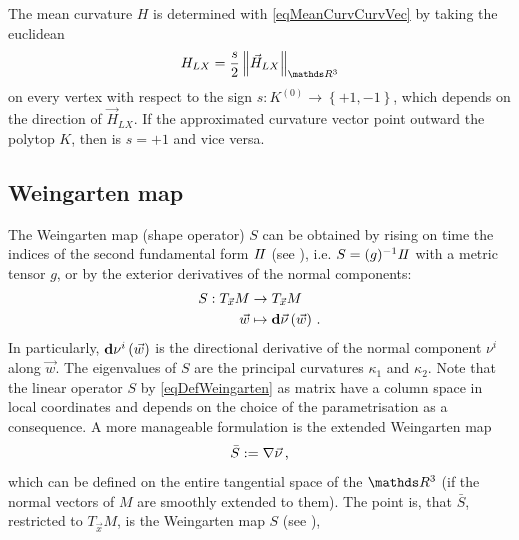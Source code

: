     The mean curvature \( H \) is determined with \eqref{eqMeanCurvCurvVec} by taking the euclidean 
    \begin{align}
      H_{LX} = \frac{s}{2}\left\| \vec{H}_{LX} \right\|_{\R^{3}}
    \end{align}
    on every vertex with respect to the sign \( s:K^{(0)}\rightarrow\left\{ +1,-1 \right\} \),
    which depends on the direction of \(  \vec{H}_{LX} \).
    If the approximated curvature vector point outward the polytop \( K \), then is \( s=+1 \) and vice versa. 

    
    


  \subsection{Weingarten map} \label{secWeingarten}
    The Weingarten map (shape operator) \( S \)
    can be obtained by rising on time the indices of the second fundamental form \( I \! I \)
    (see \cite{FirstCourse}),
    i.e. \( S = (g)^{-1}I \! I \) with a metric tensor \( g \),
    or by the exterior derivatives of the normal components:
    \begin{align}
    \begin{aligned}\label{eqDefWeingarten}
      S: T_{\vec{x}}M &\rightarrow T_{\vec{x}}M \\
                    \vec{w} &\mapsto \mathbf{d}\vec{\nu} \left( \vec{w} \right) \,\text{.}
    \end{aligned}
    \end{align}
    In particularly, \( \mathbf{d}\nu^{i} \left( \vec{w} \right) \) is the directional derivative of the  normal component \( \nu^{i} \) 
    along \( \vec{w} \).
    The eigenvalues of \( S \) are the principal curvatures \( \kappa_{1} \) and \( \kappa_{2} \).
    Note that the linear operator \( S \) by \eqref{eqDefWeingarten} as matrix have a column space in local coordinates 
    and depends on the choice of the parametrisation as a consequence.
    A more manageable formulation is the extended Weingarten map
    \begin{align}\label{eqDefExWeingarten}
      \bar{S}:= \nabla\vec{\nu} \,\text{,}
    \end{align}
    which can be defined on the entire tangential space of the \( \R^{3} \) (if the normal vectors of \( M \) are smoothly extended to them).
    The point is, that \( \bar{S} \), restricted to \( T_{\vec{x}}M \), is the Weingarten map \( S \) (see \cite[Pt. 2, Ch. 2]{kimura}),
